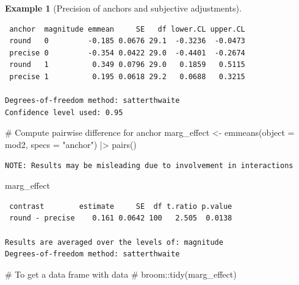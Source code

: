 \documentclass[
  11pt,
  letterpaper,
]{scrbook}
\newenvironment{Shaded}{\begin{snugshade}}{\end{snugshade}}
\newcommand{\AttributeTok}[1]{\textcolor[rgb]{0.40,0.45,0.13}{#1}}
\newcommand{\CommentTok}[1]{\textcolor[rgb]{0.37,0.37,0.37}{#1}}
\newcommand{\FunctionTok}[1]{\textcolor[rgb]{0.28,0.35,0.67}{#1}}
\newcommand{\NormalTok}[1]{\textcolor[rgb]{0.00,0.23,0.31}{#1}}
\newcommand{\OtherTok}[1]{\textcolor[rgb]{0.00,0.23,0.31}{#1}}
\newcommand{\SpecialCharTok}[1]{\textcolor[rgb]{0.37,0.37,0.37}{#1}}
\newcommand{\StringTok}[1]{\textcolor[rgb]{0.13,0.47,0.30}{#1}}
\theoremstyle{definition}
\theoremstyle{definition}
\newtheorem{example}{Example}[chapter]
\theoremstyle{remark}
\begin{document}
\begin{example}[Precision of anchors and subjective
adjustments]
\begin{verbatim}
 anchor  magnitude emmean     SE   df lower.CL upper.CL
 round   0         -0.185 0.0676 29.1  -0.3236  -0.0473
 precise 0         -0.354 0.0422 29.0  -0.4401  -0.2674
 round   1          0.349 0.0796 29.0   0.1859   0.5115
 precise 1          0.195 0.0618 29.2   0.0688   0.3215

Degrees-of-freedom method: satterthwaite 
Confidence level used: 0.95 
\end{verbatim}

\begin{Shaded}
\begin{Highlighting}[]
\CommentTok{\# Compute pairwise difference for anchor}
\NormalTok{marg\_effect }\OtherTok{\textless{}{-}} \FunctionTok{emmeans}\NormalTok{(}\AttributeTok{object =}\NormalTok{ mod2, }
        \AttributeTok{specs =} \StringTok{"anchor"}\NormalTok{) }\SpecialCharTok{|\textgreater{}} 
  \FunctionTok{pairs}\NormalTok{()}
\end{Highlighting}
\end{Shaded}

\begin{verbatim}
NOTE: Results may be misleading due to involvement in interactions
\end{verbatim}

\begin{Shaded}
\begin{Highlighting}[]
\NormalTok{marg\_effect}
\end{Highlighting}
\end{Shaded}

\begin{verbatim}
 contrast        estimate     SE  df t.ratio p.value
 round - precise    0.161 0.0642 100   2.505  0.0138

Results are averaged over the levels of: magnitude 
Degrees-of-freedom method: satterthwaite 
\end{verbatim}

\begin{Shaded}
\begin{Highlighting}[]
\CommentTok{\# To get a data frame with data}
\CommentTok{\# broom::tidy(marg\_effect)}
\end{Highlighting}
\end{Shaded}


\end{example}
\end{document}
